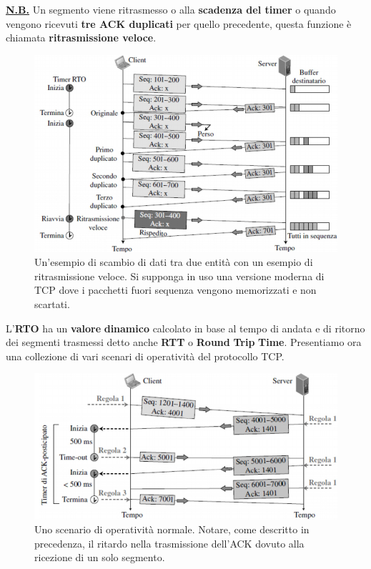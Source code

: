 \documentclass[11pt,a4paper,oneside]{book}
\theoremstyle{definition}
\begin{document}
\textbf{\underline{N.B.}} Un segmento viene ritrasmesso o alla \textbf{scadenza del timer} o quando vengono ricevuti \textbf{tre ACK duplicati} per quello precedente, questa funzione è chiamata \textbf{ritrasmissione veloce}.
\begin{figure}[!h]
	\includegraphics[scale=0.4]{Immagini/Fast_retrsm.png}
	\centering
	\caption{Un'esempio di scambio di dati tra due entità con un esempio di ritrasmissione veloce. Si supponga in uso una versione moderna di TCP dove i pacchetti fuori sequenza vengono memorizzati e non scartati.}
\end{figure}\newline
L'\textbf{RTO} ha un \textbf{valore} \textbf{dinamico} calcolato in base al tempo di andata e di ritorno dei segmenti trasmessi detto anche \textbf{RTT} o \textbf{Round} \textbf{Trip} \textbf{Time}.\newline\newline
Presentiamo ora una collezione di vari scenari di operatività del protocollo TCP.
\begin{figure}[!h]
	\includegraphics[scale=0.35]{Immagini/Norm_op.png}
	\centering
	\caption{Uno scenario di operatività normale. Notare, come descritto in precedenza, il ritardo nella trasmissione dell'ACK dovuto alla ricezione di un solo segmento.}
\end{figure}
\end{document}
